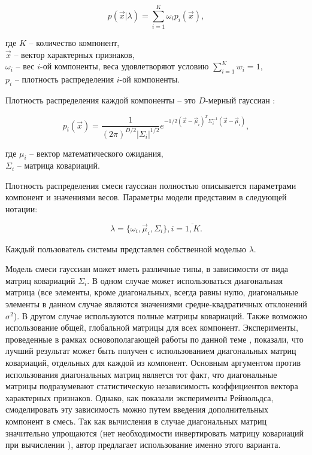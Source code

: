 \begin{equation}
p(\vec x | \lambda) = \sum_{i=1}^K{\omega_i p_i(\vec x)},
\end{equation}

\noindent где $K$ -- количество компонент,\\
$\vec x$ -- вектор характерных признаков,\\
$\omega_i$ -- вес $i$-ой компоненты, веса удовлетворяют условию $\sum_{i=1}^K w_i = 1$,\\
$p_i$ -- плотность распределения $i$-ой компоненты.

Плотность распределения каждой компоненты -- это $D$-мерный гауссиан \cite{BMSTUM16}:

\begin{equation}
\label{eq:mdnormalpdf}
p_i(\vec x) = \frac{1}{(2\pi)^{D/2} |\Sigma_i|^{1/2}}e^{-1/2(\vec x - \vec \mu_i)^T \Sigma_i^{-1} (\vec x - \vec \mu_i)},
\end{equation}

\noindent где $\mu_i$ -- вектор математического ожидания,\\
$\Sigma_i$ -- матрица ковариаций.

Плотность распределения смеси гауссиан полностью описывается параметрами компонент и значениями весов. Параметры модели представим в следующей нотации:

\begin{equation}
\lambda = \{ \omega_i, \vec \mu_i, \Sigma_i  \}, i = \overline{1,K}.
\end{equation}

Каждый пользователь системы представлен собственной моделью $\lambda$.

Модель смеси гауссиан может иметь различные типы, в зависимости от вида матриц ковариаций $\Sigma_i$. В одном случае может использоваться диагональная матрица (все элементы, кроме диагональных, всегда равны нулю, диагональные элементы в данном случае являются значениями средне-квадратичных отклонений $\sigma^2$). В другом случае используются полные матрицы ковариаций. Также возможно использование общей, глобальной матрицы для всех компонент. Эксперименты, проведенные в рамках основополагающей работы по данной теме \cite{Reynolds95gmm}, показали, что лучший результат может быть получен с использованием диагональных матриц ковариаций, отдельных для каждой из компонент. Основным аргументом против использования диагональных матриц является тот факт, что диагональные матрицы подразумевают статистическую независимость коэффициентов вектора характерных признаков. Однако, как показали эксперименты Рейнольдса, смоделировать эту зависимость можно путем введения дополнительных компонент в смесь. Так как вычисления в случае диагональных матриц значительно упрощаются (нет необходимости инвертировать матрицу ковариаций при вычислении ), автор предлагает использование именно этого варианта.

